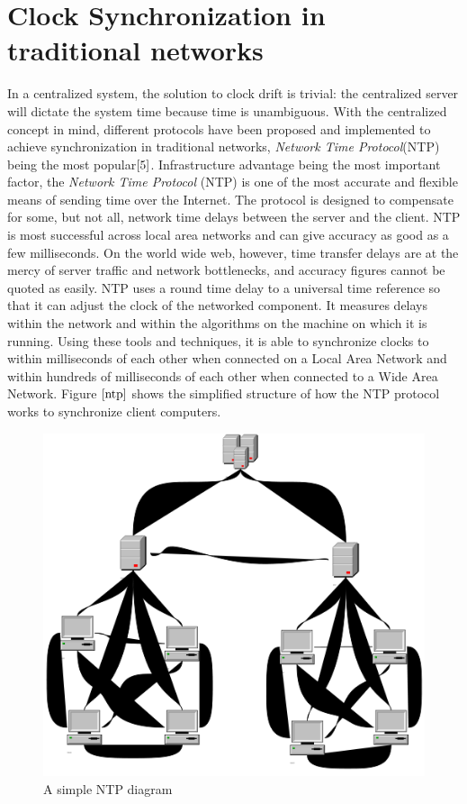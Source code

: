 \documentclass[a4paper,10pt]{report}
\begin{document}
\section{\textbf{Clock Synchronization in traditional networks}}
\noindent
In a centralized system, the solution to clock drift is trivial: the centralized server will dictate the system time because time is unambiguous. With the centralized concept in mind, different protocols have been proposed and implemented to achieve synchronization in traditional networks, \textit{Network Time Protocol}(NTP) being the most popular$\cite{5}$. 
\newline
Infrastructure advantage being the most important factor, the \emph{Network Time Protocol} (NTP) is one of the most accurate and
flexible means of sending time over the Internet. The protocol is designed to compensate for some, but not all, network time delays
between the server and the client. NTP is most successful across local area networks and can give accuracy as good as a few
milliseconds. On the world wide web, however, time transfer delays are at the mercy of server traffic and network bottlenecks, and
accuracy figures cannot be quoted as easily. NTP uses a round time delay to a universal time reference so that it can adjust the clock
of the networked component. It measures delays within the network and within the algorithms on the machine on which it is running. Using these tools and techniques, it is able to synchronize clocks to within milliseconds of each other when connected on a Local Area Network and within hundreds of milliseconds of each other when connected to a Wide Area Network. Figure $\ref{ntp}$ shows the simplified structure of how the NTP protocol works to synchronize client computers.
\begin{figure}
\centering
\includegraphics[width= 0.5 \textwidth]{ntp}
\caption{A simple NTP diagram} \label{ntp}
\end{figure}
\newline
\end{document}

